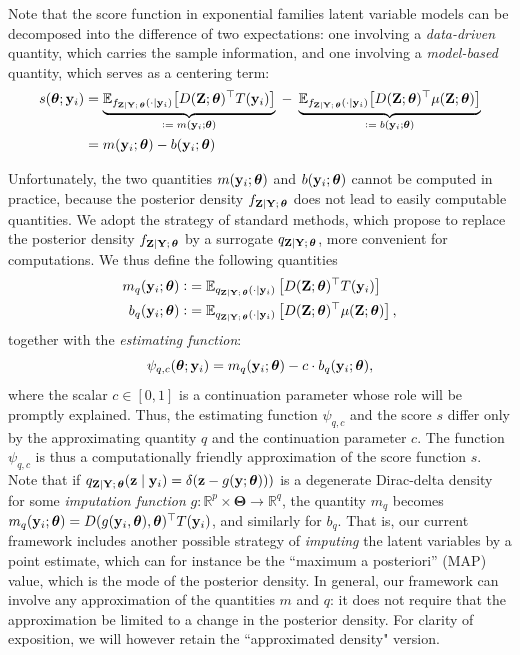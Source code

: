 \documentclass[twoside,11pt]{article}
\begin{document}
Note that the score function in exponential families latent variable models can be decomposed into the difference of two expectations: 
one involving a \emph{data-driven} quantity, which carries the sample information, 
and one involving a \emph{model-based} quantity, which serves as a centering term:
\begin{align}
    s({\bm{\theta}};{\bf y}_i) 
    &= \underbrace{\mathbb{E}_{f_{{\bf Z}\mid{\bf Y};\,{\bm{\theta}}}(\cdot\mid {\bf y}_i)}\!\left[ D({\bf Z};{\bm{\theta}})^\top T({\bf y}_i) \right]}_{\vcentcolon =\; m({\bf y}_i; {\bm{\theta}})}
    \;-\;
    \underbrace{\mathbb{E}_{f_{{\bf Z}\mid{\bf Y};\,{\bm{\theta}}}(\cdot\mid {\bf y}_i)}\!\left[ D({\bf Z};{\bm{\theta}})^\top \mu({\bf Z}; {\bm{\theta}})\right]}_{\vcentcolon =\; b({\bf y}_i; {\bm{\theta}})}\\
    &= m({\bf y}_i; {\bm{\theta}}) - b({\bf y}_i;{\bm{\theta}})
\label{eqn:score_expfam_decomposed}
\end{align}

% 
Unfortunately, the two quantities $m({\bf y}_i;{\bm{\theta}})$ and $b({\bf y}_i;{\bm{\theta}})$ cannot be computed in practice, because the posterior density $f_{{\bf Z}\mid{\bf Y};\,{\bm{\theta}}}$ does not lead to easily computable quantities. We adopt the strategy of standard methods, which propose to replace the posterior density $f_{{\bf Z}\mid{\bf Y};\,{\bm{\theta}}}$ by a surrogate $q_{{\bf Z}\mid{\bf Y};\,{\bm{\theta}}}$, more convenient for computations. We thus define the following quantities
%
\begin{align}
m_q({\bf y}_i; {\bm{\theta}}) \vcentcolon &= \mathbb{E}_{q_{{\bf Z}\mid{\bf Y};\,{\bm{\theta}}}(\cdot\mid {\bf y}_i)}\left[D({\bf Z};{\bm{\theta}})^\top T({\bf y}_i)\right]\\
b_q({\bf y}_i; {\bm{\theta}}) \vcentcolon &= \mathbb{E}_{q_{{\bf Z}\mid{\bf Y};\,{\bm{\theta}}}(\cdot\mid {\bf y}_i)}\left[D({\bf Z};{\bm{\theta}})^\top \mu({\bf Z}; {\bm{\theta}})\right],
\end{align}
%
together with the \textit{estimating function}:
%
\begin{equation}
    \psi_{q,c}({\bm{\theta}};{\bf y}_i) = m_q({\bf y}_i; {\bm{\theta}}) - c \cdot b_q({\bf y}_i; {\bm{\theta}}),
    \label{eqn:psi-q-c}
\end{equation}
where the scalar $c\in [0,1]$ is a continuation parameter whose role will be promptly explained. Thus, the estimating function $\psi_{q,c}$ and the score $s$ differ only by the approximating quantity $q$ and the continuation parameter $c$. The function $\psi_{q,c}$ is thus a computationally friendly approximation of the score function $s$. Note that if $q_{{\bf Z}\mid{\bf Y};\,{\bm{\theta}}}({\bf z} \mid {\bf y}_i) = \delta({\bf z} - g({\bf y}; {\bm{\theta}})))$ is a degenerate Dirac-delta density for some \textit{imputation function} $g: \mathbb{R}^p \times \bm \Theta \to \mathbb{R}^q$, the quantity $m_q$ becomes $m_q({\bf y}_i;{\bm{\theta}}) = D(g({\bf y}_i, {\bm{\theta}}), {\bm{\theta}})^\top T({\bf y}_i)$, and similarly for $b_q$. That is, our current framework includes another possible strategy of \textit{imputing} the latent variables by a point estimate, which can for instance be the ``maximum a posteriori'' (MAP) value, which is the mode of the posterior density. In general, our framework can involve any approximation of the quantities $m$ and $q$:  it does not require that the approximation be limited to a change in the posterior density. For clarity of exposition, we will however retain the ``approximated density" version. 
\end{document}
